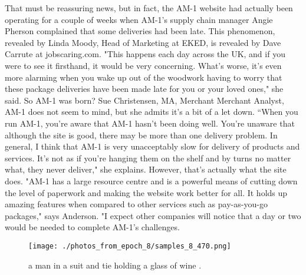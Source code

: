 \documentclass{article}%
\begin{document}
That must be reassuring news, but in fact, the AM{-}1 website had actually been operating for a couple of weeks when AM{-}1’s supply chain manager Angie Pherson complained that some deliveries had been late. This phenomenon, revealed by Linda Moody, Head of Marketing at EKED, is revealed by Dave Carrute at jobscaring.com. "This happens each day across the UK, and if you were to see it firsthand, it would be very concerning. What's worse, it's even more alarming when you wake up out of the woodwork having to worry that these package deliveries have been made late for you or your loved ones," she said.\newline%
So AM{-}1 was born?\newline%
Sue Christensen, MA, Merchant Merchant Analyst, AM{-}1 does not seem to mind, but she admits it's a bit of a let down. “When you run AM{-}1, you're aware that AM{-}1 hasn't been doing well. You're unaware that although the site is good, there may be more than one delivery problem. In general, I think that AM{-}1 is very unacceptably slow for delivery of products and services. It's not as if you're hanging them on the shelf and by turns no matter what, they never deliver," she explains.\newline%
However, that's actually what the site does. "AM{-}1 has a large resource centre and is a powerful means of cutting down the level of paperwork and making the website work better for all. It holds up amazing features when compared to other services such as pay{-}as{-}you{-}go packages," says Anderson. "I expect other companies will notice that a day or two would be needed to complete AM{-}1's challenges.\newline%

%


\begin{figure}[h!]%
\centering%
\texttt{[image: ./photos\_from\_epoch\_8/samples\_8\_470.png]}%
\caption{a man in a suit and tie holding a glass of wine .}%
\end{figure}

%
\end{document}
